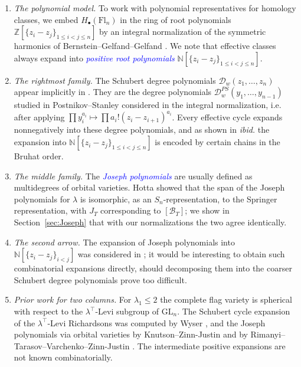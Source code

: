 \documentclass[11pt]{amsart}
\theoremstyle{definition}
\numberwithin{equation}{section}
\newcommand{\fl}[1]{\mathrm{Fl}_{#1}}
\newcommand{\GL}{\mathrm{GL}}
\renewcommand\emph[1]{\textcolor{blue}{\textit{#1}}} %
\begin{document}
\begin{enumerate}
    \item \textit{The polynomial model.}
    To work with polynomial representatives for homology classes, we embed $H_\bullet(\fl{n})$ in the ring of root polynomials $\mathbb{Z}[\{z_i-z_j\}_{1\le i < j \le n}]$ by an integral normalization of the symmetric harmonics of Bernstein--Gelfand--Gelfand \cite{BGG73}.
    We note that effective classes always expand into \emph{positive root polynomials} $\mathbb{N}[\{z_i-z_j\}_{1\le i < j \le n}]$.
    \item \textit{The rightmost family.} The Schubert degree polynomials $\mathcal{D}_w(z_1,\ldots,z_n)$ appear implicitly in \cite[Theorem 3.13]{BGG73}. They are the degree polynomials $\mathcal{D}_w^{PS}(y_1,\ldots,y_{n-1})$ studied in Postnikov--Stanley \cite{PS09} considered in the integral normalization, i.e. after applying $\prod y_i^{a_i}\mapsto \prod a_i!(z_i-z_{i+1})^{a_i}$. Every effective cycle expands nonnegatively into these degree polynomials, and as shown in \textit{ibid.} the expansion into $\mathbb{N}[\{z_i-z_j\}_{1\le i < j \le n}]$ is encoded by certain chains in the Bruhat order.
    \item \textit{The middle family.} The \emph{Joseph polynomials} \cite{Jo84,Jo89,KZJ14, RTVZJ12} are usually defined as multidegrees of orbital varieties. Hotta \cite{Ho84} showed that the span of the Joseph polynomials for $\lambda$ is isomorphic, as an $S_n$-representation, to the Springer representation, with $J_T$ corresponding to $[\mathcal{B}_T]$; we show in Section~\ref{sec:Joseph} that with our normalizations the two agree identically.
    \item \textit{The second arrow.}
    The expansion of Joseph polynomials into
    $\mathbb{N}[\{z_i-z_j\}_{i<j}]$ was considered in \cite[Section 8]{Jo89}; it would
    be interesting to obtain such combinatorial expansions directly, should decomposing
    them into the coarser Schubert degree polynomials prove too difficult.
    \item \textit{Prior work for two columns.} For $\lambda_1\le 2$ the complete flag variety is spherical with respect to the $\lambda^{\top}$-Levi subgroup of $\GL_n$. The Schubert cycle expansion of the
    $\lambda^{\top}$-Levi Richardsons was computed by Wyser \cite{W13}, and the Joseph
    polynomials via orbital varieties by Knutson--Zinn-Justin \cite{KZJ14} and by Rimanyi--Tarasov--Varchenko--Zinn-Justin  \cite{RTVZJ12}. The intermediate positive
    expansions are not known combinatorially.
\end{enumerate}
\end{document}
